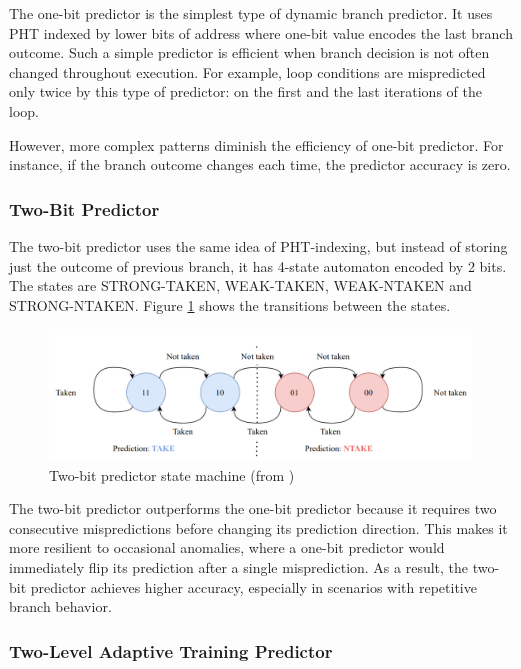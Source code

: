 The one-bit predictor is the simplest type of dynamic branch predictor. It uses PHT indexed by lower bits of address where one-bit value encodes the last branch outcome. Such a simple predictor is efficient when branch decision is not often changed throughout execution. For example, loop conditions are mispredicted only twice by this type of predictor: on the first and the last iterations of the loop.

However, more complex patterns diminish the efficiency of one-bit predictor. For instance, if the branch outcome changes each time, the predictor accuracy is zero.

\subsubsection{Two-Bit Predictor}

The two-bit predictor uses the same idea of PHT-indexing, but instead of storing just the outcome of previous branch, it has 4-state automaton encoded by 2 bits. The states are STRONG-TAKEN, WEAK-TAKEN, WEAK-NTAKEN and STRONG-NTAKEN. Figure \ref{fig:two-bit-counter} shows the transitions between the states.

\begin{figure}[H]
    \includegraphics[width=\textwidth]{figures/two-bit-counter.png}
    \caption{Two-bit predictor state machine (from \cite{mahling_reverse_2023})}
    \label{fig:two-bit-counter}
\end{figure}

The two-bit predictor outperforms the one-bit predictor because it requires two consecutive mispredictions before changing its prediction direction. This makes it more resilient to occasional anomalies, where a one-bit predictor would immediately flip its prediction after a single misprediction. As a result, the two-bit predictor achieves higher accuracy, especially in scenarios with repetitive branch behavior.


\subsubsection{Two-Level Adaptive Training Predictor}

